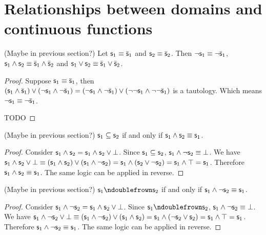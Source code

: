 \documentclass[11pt,letterpaper,fleqn]{memoir} %
\begin{document}
\section{Relationships between domains and continuous functions}

\begin{mathSection}
	
	\begin{prop}
		(Maybe in previous section?) Let $\mathsf{s}_1 \equiv \bar{\mathsf{s}}_1$ and $\mathsf{s}_2 \equiv \bar{\mathsf{s}}_2$. Then $\neg \mathsf{s}_1 \equiv \neg \bar{\mathsf{s}}_1$, $\mathsf{s}_1 \wedge \mathsf{s}_2 \equiv \bar{\mathsf{s}}_1 \wedge \bar{\mathsf{s}}_2$ and $\mathsf{s}_1 \vee \mathsf{s}_2 \equiv \bar{\mathsf{s}}_1 \vee \bar{\mathsf{s}}_2$.
	\end{prop}
	
	\begin{proof}
		Suppose $\mathsf{s}_1 \equiv \bar{\mathsf{s}}_1$, then $(\mathsf{s}_1 \wedge \bar{\mathsf{s}}_1) \vee (\neg \mathsf{s}_1 \wedge \neg \bar{\mathsf{s}}_1) = ( \neg\mathsf{s}_1 \wedge \neg \bar{\mathsf{s}}_1) \vee (\neg \neg \mathsf{s}_1 \wedge \neg \neg \bar{\mathsf{s}}_1)$ is a tautology. Which means $\neg \mathsf{s}_1 \equiv \neg \bar{\mathsf{s}}_1$.
		
		TODO
	\end{proof}	
	
	\begin{prop}
		(Maybe in previous section?) $\mathsf{s}_1 \subseteq \mathsf{s}_2$ if and only if $\mathsf{s}_1 \wedge \mathsf{s}_2 \equiv \mathsf{s}_1$.
	\end{prop}
	
	\begin{proof}
		Consider $\mathsf{s}_1 \wedge \mathsf{s}_2 = \mathsf{s}_1 \wedge \mathsf{s}_2 \vee \bot$. Since $\mathsf{s}_1 \subseteq \mathsf{s}_2$, $\mathsf{s}_1 \wedge \neg \mathsf{s}_2 \equiv \bot$. We have $\mathsf{s}_1 \wedge \mathsf{s}_2 \vee \bot \equiv ( \mathsf{s}_1 \wedge \mathsf{s}_2 ) \vee (\mathsf{s}_1 \wedge \neg \mathsf{s}_2) = \mathsf{s}_1 \wedge (\mathsf{s}_2 \vee \neg \mathsf{s}_2) = \mathsf{s}_1 \wedge \top = \mathsf{s}_1$. Therefore $\mathsf{s}_1 \wedge \mathsf{s}_2 \equiv \mathsf{s}_1$. The same logic can be applied in reverse.
	\end{proof}	
	
\begin{prop}
	(Maybe in previous section?) $\stmt_1 \ncomp \stmt_2$ if and only if $\mathsf{s}_1 \wedge \neg \mathsf{s}_2 \equiv \mathsf{s}_1$.
\end{prop}

\begin{proof}
	Consider $\mathsf{s}_1 \wedge \neg \mathsf{s}_2 = \mathsf{s}_1 \wedge \mathsf{s}_2 \vee \bot$. Since $\stmt_1 \ncomp \stmt_2$, $\mathsf{s}_1 \wedge \neg \mathsf{s}_2 \equiv \bot$. We have $\mathsf{s}_1 \wedge \neg \mathsf{s}_2 \vee \bot \equiv ( \mathsf{s}_1 \wedge \neg \mathsf{s}_2 ) \vee (\mathsf{s}_1 \wedge \mathsf{s}_2) = \mathsf{s}_1 \wedge (\neg \mathsf{s}_2 \vee \mathsf{s}_2) = \mathsf{s}_1 \wedge \top = \mathsf{s}_1$. Therefore $\mathsf{s}_1 \wedge \neg \mathsf{s}_2 \equiv \mathsf{s}_1$. The same logic can be applied in reverse.
\end{proof}	
	

\end{mathSection}
\end{document}
